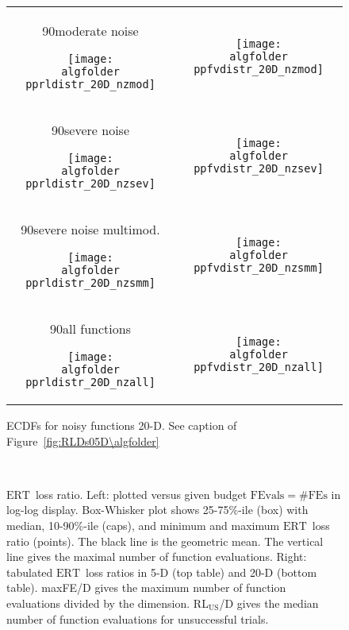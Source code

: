 \documentclass{article}
\newcommand{\ERT}{\ensuremath{\mathrm{ERT}}}
\newcommand{\FEvals}{\ensuremath{\mathrm{FEvals}}}
\newcommand{\nbFEs}{\ensuremath{\mathrm{\#FEs}}}
\newcommand{\rot}[2][2.5]{
  \hspace*{-3.5\baselineskip}%
  \begin{rotate}{90}\hspace{#1em}#2
  \end{rotate}}
\newcommand{\bbobdatapath}{ppdata/} %
\begin{document}
\begin{figure}[htbp!]
\centering
\begin{tabular}{@{}c@{}c@{}}
\rot[2.]{moderate noise}
\texttt{[image: \\algfolder pprldistr\_20D\_nzmod]} &
\texttt{[image: \\algfolder ppfvdistr\_20D\_nzmod]}
\\[-1ex]
\rot[2.8]{severe noise}
\texttt{[image: \\algfolder pprldistr\_20D\_nzsev]} &
\texttt{[image: \\algfolder ppfvdistr\_20D\_nzsev]}
\\[-1ex]
\rot[0.6]{severe noise multimod.}
\texttt{[image: \\algfolder pprldistr\_20D\_nzsmm]} &
\texttt{[image: \\algfolder ppfvdistr\_20D\_nzsmm]}\\[-1ex]
\rot[2.8]{all functions}
\texttt{[image: \\algfolder pprldistr\_20D\_nzall]} &
\texttt{[image: \\algfolder ppfvdistr\_20D\_nzall]}
\end{tabular}
\vspace*{-2ex}
\caption{\label{fig:RLDs20D\algfolder}ECDFs for noisy functions 20-D. See caption of
Figure~\ref{fig:RLDs05D\algfolder}}
\end{figure}
\begin{figure}[htbp!]
\subfloat{
\centering
\scriptsize
}\\[-2ex]
\subfloat{
\centering
\scriptsize
}
\caption{\label{fig:ERTloglossa\algfolder}
\ERT\ loss ratio. Left: plotted versus given budget
$\FEvals=\nbFEs$ in log-log display. Box-Whisker plot shows 25-75\%-ile (box)
with median, 10-90\%-ile (caps), and minimum and maximum \ERT\ loss ratio
(points). The black line is the geometric mean. The vertical line gives the
maximal number of function evaluations. Right: tabulated \ERT\ loss ratios
in 5-D (top table) and 20-D (bottom table). maxFE/D gives the maximum number of
function evaluations divided by the dimension. RL$_{\text{US}}$/D gives the
median number of function evaluations for unsuccessful trials.}
\end{figure}
\end{document}
